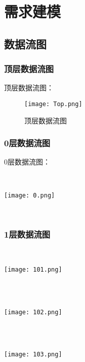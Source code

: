 \chapter{需求建模 }
\section{数据流图}
\subsection{顶层数据流图}

顶层数据流图：
\begin{figure}[ht]
	\centering
    \texttt{[image: Top.png]}
	\caption{顶层数据流图} \label{fig:figure3}
	\end{figure}

\subsection{0层数据流图}
0层数据流图：

\quad\\[\intextsep] 
  \begin{minipage}{\textwidth} 
    \centering 
    \texttt{[image: 0.png]}%
    \label{fig:non:float} 
  \end{minipage} 
  \quad\\[\intextsep] 

\subsection{1层数据流图}


\quad\\[\intextsep] 
  \begin{minipage}{\textwidth} 
    \centering 
    \texttt{[image: 101.png]}%
     \label{fig:non:float} 
  \end{minipage} 
  \quad\\[\intextsep] 


  
\quad\\[\intextsep] 
\begin{minipage}{\textwidth} 
  \centering 
  \texttt{[image: 102.png]}%
  \label{fig:non:float} 
\end{minipage} 
\quad\\[\intextsep] 


\quad\\[\intextsep] 
\begin{minipage}{\textwidth} 
  \centering 
  \texttt{[image: 103.png]}%
  \label{fig:non:float} 
\end{minipage} 
\quad\\[\intextsep] 

